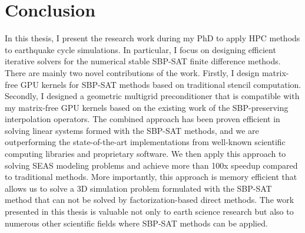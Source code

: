 \section{Conclusion}
In this thesis, I present the research work during my PhD to apply HPC methods to earthquake cycle simulations.
In particular, I focus on designing efficient iterative solvers for the numerical stable SBP-SAT finite difference methods.
There are mainly two novel contributions of the work. Firstly, I design matrix-free GPU kernels for SBP-SAT methods based on traditional stencil computation. Secondly, I designed a geometric multigrid preconditioner that is compatible with my matrix-free GPU kernels based on the existing work of the SBP-preserving interpolation operators.
The combined approach has been proven efficient in solving linear systems formed with the SBP-SAT methods, and we are outperforming the state-of-the-art implementations from well-known scientific computing libraries and proprietary software.
We then apply this approach to solving SEAS modeling problems and achieve more than 100x speedup compared to traditional methods.
More importantly, this approach is memory efficient that allows us to solve a 3D simulation problem formulated with the SBP-SAT method that can not be solved by factorization-based direct methods. 
The work presented in this thesis is valuable not only to earth science research but also to numerous other scientific fields where SBP-SAT methods can be applied.